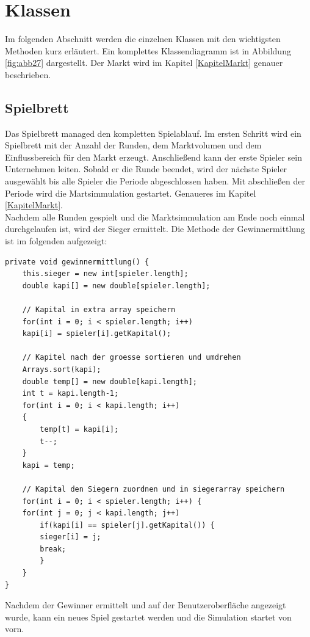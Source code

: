 \newpage
\section{Klassen}
Im folgenden Abschnitt werden die einzelnen Klassen mit den wichtigsten Methoden kurz erläutert. Ein komplettes Klassendiagramm ist in Abbildung \ref{fig:abb27} dargestellt. Der Markt wird im Kapitel \ref{KapitelMarkt} genauer beschrieben.

\subsection{Spielbrett}
Das Spielbrett managed den kompletten Spielablauf. Im ersten Schritt wird ein Spielbrett mit der Anzahl der Runden, dem Marktvolumen und dem Einflussbereich für den Markt erzeugt. Anschließend kann der erste Spieler sein Unternehmen leiten. Sobald er die Runde beendet, wird der nächste Spieler ausgewählt bis alle Spieler die Periode abgeschlossen haben. Mit abschließen der Periode wird die Martsimmulation gestartet. Genaueres im Kapitel \ref{KapitelMarkt}. \\
Nachdem alle Runden gespielt und die Marktsimmulation am Ende noch einmal durchgelaufen ist, wird der Sieger ermittelt. Die Methode der Gewinnermittlung ist im folgenden aufgezeigt: \\

\lstset{language=Java} 
\begin{lstlisting}
private void gewinnermittlung() {
	this.sieger = new int[spieler.length];
	double kapi[] = new double[spieler.length];
	
	// Kapital in extra array speichern
	for(int i = 0; i < spieler.length; i++)
	kapi[i] = spieler[i].getKapital();
	
	// Kapitel nach der groesse sortieren und umdrehen		
	Arrays.sort(kapi);
	double temp[] = new double[kapi.length];
	int t = kapi.length-1;
	for(int i = 0; i < kapi.length; i++)
	{
		temp[t] = kapi[i];
		t--;
	}
	kapi = temp;
	
	// Kapital den Siegern zuordnen und in siegerarray speichern
	for(int i = 0; i < spieler.length; i++) {
	for(int j = 0; j < kapi.length; j++)
		if(kapi[i] == spieler[j].getKapital()) {
		sieger[i] = j;
		break;
		}
	}
}
\end{lstlisting}

Nachdem der Gewinner ermittelt und auf der Benutzeroberfläche angezeigt wurde, kann ein neues Spiel gestartet werden und die Simulation startet von vorn.

